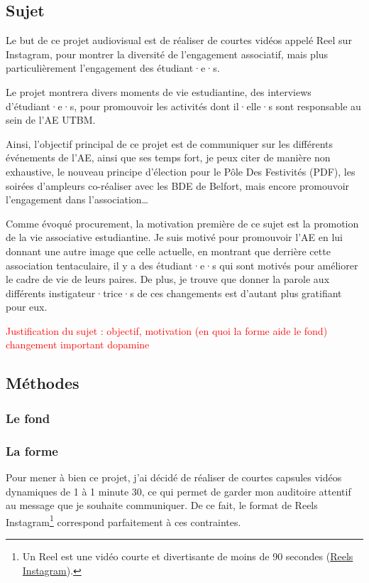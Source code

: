 
\subsection{Sujet}\label{subsec:sujet}

Le but de ce projet audiovisual est de réaliser de courtes vidéos appelé Reel sur Instagram, pour montrer la diversité de l'engagement associatif, mais plus particulièrement l'engagement des étudiant·e·s.

Le projet montrera divers moments de vie estudiantine, des interviews d'étudiant·e·s, pour promouvoir les activités dont il·elle·s sont responsable au sein de l'AE UTBM.

Ainsi, l'objectif principal de ce projet est de communiquer sur les différents événements de l'AE, ainsi que ses temps fort, je peux citer de manière non exhaustive, le nouveau principe d'élection pour le Pôle Des Festivités (PDF), les soirées d'ampleurs co-réaliser avec les BDE de Belfort, mais encore promouvoir l'engagement dans l'association\ldots

Comme évoqué procurement, la motivation première de ce sujet est la promotion de la vie associative estudiantine.
Je suis motivé pour promouvoir l'AE en lui donnant une autre image que celle actuelle, en montrant que derrière cette association tentaculaire, il y a des étudiant·e·s qui sont motivés pour améliorer le cadre de vie de leurs paires.
De plus, je trouve que donner la parole aux différents instigateur·trice·s de ces changements est d'autant plus gratifiant pour eux.

\textcolor{red}{Justification du sujet : objectif, motivation (en quoi la forme aide le fond) changement important dopamine}


\subsection{Méthodes}\label{subsec:methodes}


\subsubsection{Le fond}


\subsubsection{La forme}

Pour mener à bien ce projet, j'ai décidé de réaliser de courtes capsules vidéos dynamiques de 1 à 1 minute 30, ce qui permet de garder mon auditoire attentif au message que je souhaite communiquer.
De ce fait, le format de Reels Instagram\footnote{Un Reel est une vidéo courte et divertisante de moins de 90 secondes (\href{https://about.instagram.com/fr-fr/features/reels}{Reels Instagram}).} correspond parfaitement à ces contraintes.




